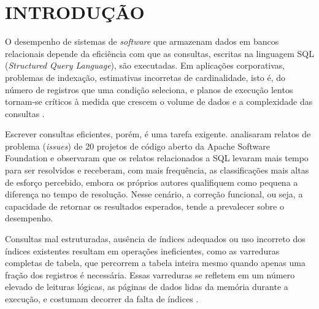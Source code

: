 
\section{INTRODUÇÃO}\label{sec:introducao}

O desempenho de sistemas de \textit{software} que armazenam dados em bancos relacionais depende da eficiência com que as consultas, escritas na linguagem SQL (\textit{Structured Query Language}), são executadas. Em aplicações corporativas, problemas de indexação, estimativas incorretas de cardinalidade, isto é, do número de registros que uma condição seleciona, e planos de execução lentos tornam-se críticos à medida que crescem o volume de dados e a complexidade das consultas \cite{sirigiri2025sqlperf}.

Escrever consultas eficientes, porém, é uma tarefa exigente.  analisaram relatos de problema (\textit{issues}) de 20 projetos de código aberto da Apache Software Foundation e observaram que os relatos relacionados a SQL levaram mais tempo para ser resolvidos e receberam, com mais frequência, as classificações mais altas de esforço percebido, embora os próprios autores qualifiquem como pequena a diferença no tempo de resolução. Nesse cenário, a correção funcional, ou seja, a capacidade de retornar os resultados esperados, tende a prevalecer sobre o desempenho.

Consultas mal estruturadas, ausência de índices adequados ou uso incorreto dos índices existentes resultam em operações ineficientes, como as varreduras completas de tabela, que percorrem a tabela inteira mesmo quando apenas uma fração dos registros é necessária. Essas varreduras se refletem em um número elevado de leituras lógicas, as páginas de dados lidas da memória durante a execução, e costumam decorrer da falta de índices \cite{rusanu2014perf}.

